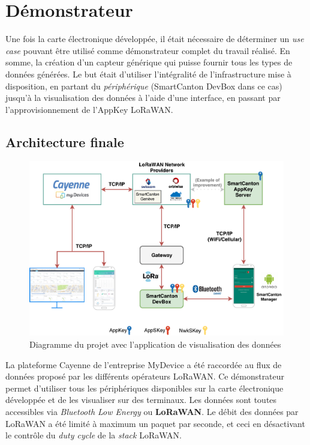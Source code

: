 \chapter{Démonstrateur}

Une fois la carte électronique développée, il était nécessaire de déterminer un \textit{use case} pouvant être utilisé comme démonstrateur complet du travail réalisé. En somme, la création d'un capteur générique qui puisse fournir tous les types de données générées. Le but était d'utiliser l'intégralité de l'infrastructure mise à disposition, en partant du \textit{périphérique} (SmartCanton DevBox dans ce cas) jusqu'à la visualisation des données à l'aide d'une interface, en passant par l'approvisionnement de l'AppKey LoRaWAN.


\section{Architecture finale}

\begin{figure}[ht!]
    \centering
    \includegraphics[width=1.0\textwidth]{Figures/Software/smartcanton_overall_project_view.pdf}
    \caption{Diagramme du projet avec l'application de visualisation des données}
    \label{fig-smartcanton_overall_project_view}
\end{figure}

La plateforme Cayenne de l'entreprise MyDevice a été raccordée au flux de données proposé par les différents opérateurs LoRaWAN. Ce démonstrateur permet d'utiliser tous les périphériques disponibles sur la carte électronique développée et de les visualiser sur des terminaux. Les données sont toutes accessibles via \textit{Bluetooth Low Energy} ou \textbf{LoRaWAN}. Le débit des données par LoRaWAN a été limité à maximum un paquet par seconde, et ceci en désactivant le contrôle du \textit{duty cycle} de la \textit{stack} LoRaWAN.

